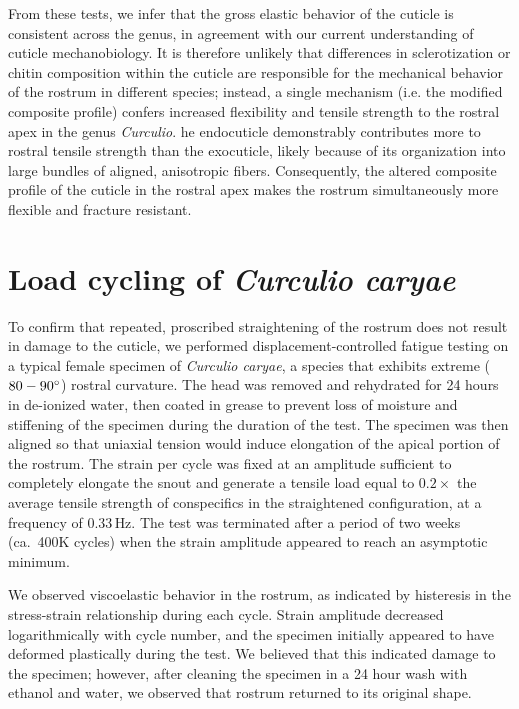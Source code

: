 \documentclass[twocolumn, linenumbers, superscriptaddress]{revtex4-1}
\begin{document}
		From these tests, we infer that the gross elastic behavior of the cuticle is consistent across the genus, in agreement with our current understanding of cuticle mechanobiology.
		It is therefore unlikely that differences in sclerotization or chitin composition within the cuticle are responsible for the mechanical behavior of the rostrum in different species; instead, a single mechanism (i.e. the modified composite profile) confers increased flexibility and tensile strength to the rostral apex in the genus \textit{Curculio}.
		he endocuticle demonstrably contributes more to rostral tensile strength than the exocuticle, likely because of its organization into large bundles of aligned, anisotropic fibers.
		Consequently, the altered composite profile of the cuticle in the rostral apex makes the rostrum simultaneously more flexible and fracture resistant.
	
	\section{Load cycling of \textit{Curculio caryae}}
		To confirm that repeated, proscribed straightening of the rostrum does not result in damage to the cuticle, we performed displacement-controlled fatigue testing on a typical female specimen of \textit{Curculio caryae}, a species that exhibits extreme ($80-90\degree$) rostral curvature.
		The head was removed and rehydrated for 24 hours in de-ionized water, then coated in grease to prevent loss of moisture and stiffening of the specimen during the duration of the test.
		The specimen was then aligned so that uniaxial tension would induce elongation of the apical portion of the rostrum.
		The strain per cycle was fixed at an amplitude sufficient to completely elongate the snout and generate a tensile load equal to $0.2\times$ the average tensile strength of conspecifics in the straightened configuration, at a frequency of $0.33\,\text{Hz}$.
		The test was terminated after a period of two weeks (ca.~400K cycles) when the strain amplitude appeared to reach an asymptotic minimum.		
		
		We observed viscoelastic behavior in the rostrum, as indicated by histeresis in the stress-strain relationship during each cycle.
		Strain amplitude decreased logarithmically with cycle number, and the specimen initially appeared to have deformed plastically during the test.
		We believed that this indicated damage to the specimen; however, after cleaning the specimen in a 24 hour wash with ethanol and water, we observed that rostrum returned to its original shape.
		
\end{document}
